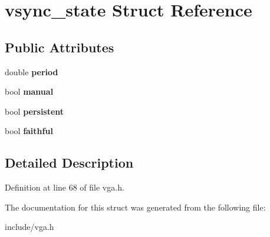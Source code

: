 \hypertarget{structvsync__state}{\section{vsync\-\_\-state Struct Reference}
\label{structvsync__state}
}
\subsection*{Public Attributes}
\begin{DoxyCompactItemize}
\item 
\hypertarget{structvsync__state_ab31e356f8dda57db35c1424304ac5f44}{double {\bfseries period}}\label{structvsync__state_ab31e356f8dda57db35c1424304ac5f44}

\item 
\hypertarget{structvsync__state_a464f94268847e463a0ec9b7657661a86}{bool {\bfseries manual}}\label{structvsync__state_a464f94268847e463a0ec9b7657661a86}

\item 
\hypertarget{structvsync__state_a43ed386d0d457124256caad15f108bac}{bool {\bfseries persistent}}\label{structvsync__state_a43ed386d0d457124256caad15f108bac}

\item 
\hypertarget{structvsync__state_a23b2944857c4a4191aa0c73a7fc1929b}{bool {\bfseries faithful}}\label{structvsync__state_a23b2944857c4a4191aa0c73a7fc1929b}

\end{DoxyCompactItemize}


\subsection{Detailed Description}


Definition at line 68 of file vga.\-h.



The documentation for this struct was generated from the following file\-:\begin{DoxyCompactItemize}
\item 
include/vga.\-h\end{DoxyCompactItemize}
